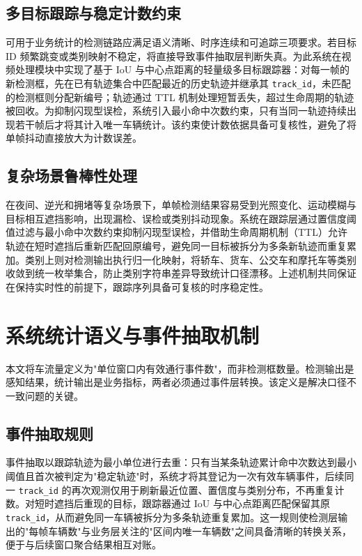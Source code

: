 \documentclass{wzuthesis} %
\begin{document}
\subsection{多目标跟踪与稳定计数约束}

可用于业务统计的检测链路应满足语义清晰、时序连续和可追踪三项要求。若目标 ID 频繁跳变或类别映射不稳定，将直接导致事件抽取层判断失真。为此系统在视频处理模块中实现了基于 IoU 与中心点距离的轻量级多目标跟踪器：对每一帧的新检测框，先在已有轨迹集合中匹配最近的历史轨迹并继承其 \texttt{track\_id}，未匹配的检测框则分配新编号；轨迹通过 TTL 机制处理短暂丢失，超过生命周期的轨迹被回收。为抑制闪现型误检，系统引入最小命中次数约束，只有当同一轨迹持续出现若干帧后才将其计入唯一车辆统计。该约束使计数依据具备可复核性，避免了将单帧抖动直接放大为计数误差。

\subsection{复杂场景鲁棒性处理}

在夜间、逆光和拥堵等复杂场景下，单帧检测结果容易受到光照变化、运动模糊与目标相互遮挡影响，出现漏检、误检或类别抖动现象。系统在跟踪层通过置信度阈值过滤与最小命中次数约束抑制闪现型误检，并借助生命周期机制（TTL）允许轨迹在短时遮挡后重新匹配回原编号，避免同一目标被拆分为多条新轨迹而重复累加。类别上则对检测输出执行归一化映射，将轿车、货车、公交车和摩托车等类别收敛到统一枚举集合，防止类别字符串差异导致统计口径漂移。上述机制共同保证在保持实时性的前提下，跟踪序列具备可复核的时序稳定性。

\section{系统统计语义与事件抽取机制}

本文将车流量定义为"单位窗口内有效通行事件数"，而非检测框数量。检测输出是感知结果，统计输出是业务指标，两者必须通过事件层转换。该定义是解决口径不一致问题的关键。

\subsection{事件抽取规则}

事件抽取以跟踪轨迹为最小单位进行去重：只有当某条轨迹累计命中次数达到最小阈值且首次被判定为"稳定轨迹"时，系统才将其登记为一次有效车辆事件，后续同一 \texttt{track\_id} 的再次观测仅用于刷新最近位置、置信度与类别分布，不再重复计数。对短时遮挡后重现的目标，跟踪器通过 IoU 与中心点距离匹配保留其原 \texttt{track\_id}，从而避免同一车辆被拆分为多条轨迹重复累加。这一规则使检测层输出的"每帧车辆数"与业务层关注的"区间内唯一车辆数"之间具备清晰的转换关系，便于与后续窗口聚合结果相互对账。
\end{document}
